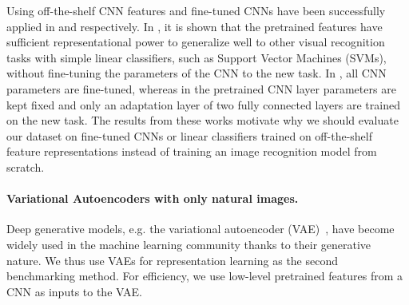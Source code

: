 Using off-the-shelf CNN features and fine-tuned CNNs have been successfully applied in  and  respectively.
In , it is shown that the pretrained features have sufficient representational power to generalize well to other visual recognition tasks with simple linear classifiers, such as Support Vector Machines (SVMs), without fine-tuning the parameters of the CNN to the new task. In , all CNN parameters are fine-tuned, whereas in  the pretrained CNN layer parameters are kept fixed and only an adaptation layer of two fully connected layers are trained on the new task. The results from these works motivate why we should evaluate our dataset on fine-tuned CNNs or linear classifiers trained on off-the-shelf feature representations instead of training an image recognition model from scratch. 

\paragraph*{Variational Autoencoders with only natural images.}
Deep generative models, 
e.g. the variational autoencoder (VAE)~, have become widely used in the machine learning community thanks to their generative nature. We thus use VAEs for representation learning as the second benchmarking method. For efficiency, we use low-level pretrained features from a CNN as inputs to the VAE.

